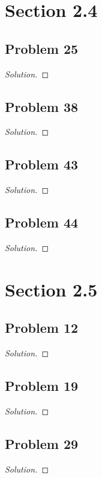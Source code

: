 \documentclass{article}
\newenvironment{solution}{\renewcommand\qedsymbol{}\begin{proof}[Solution]}{\end{proof}}
\begin{document}
\section*{Section 2.4}
\subsection*{Problem 25}
\begin{solution}
\end{solution}
\clearpage

\subsection*{Problem 38}
\begin{solution}
\end{solution}
\clearpage

\subsection*{Problem 43}
\begin{solution}
\end{solution}
\clearpage

\subsection*{Problem 44}
\begin{solution}
\end{solution}
\clearpage

\section*{Section 2.5}
\subsection*{Problem 12}
\begin{solution}
\end{solution}
\clearpage

\subsection*{Problem 19}
\begin{solution}
\end{solution}
\clearpage

\subsection*{Problem 29}
\begin{solution}
\end{solution}
\clearpage
\end{document}
